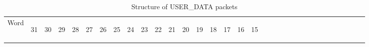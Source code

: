 \documentclass[11pt]{article}
\begin{document}
\begin{table}[h!]
    \centering
    \label{tab:userDataDef}
    \caption{Structure of USER\_DATA packets}
    \begin{tabular}{|p{1cm}|p{0.04cm}|p{0.04cm}|m{0.04cm}|m{0.04cm}|m{0.04cm}|m{0.04cm}|m{0.04cm}|m{0.04cm}|m{0.04cm}|
        m{0.04cm}|m{0.04cm}|m{0.04cm}|m{0.04cm}|m{0.04cm}|m{0.04cm}|m{0.04cm}|m{0.04cm}|m{0.04cm}|m{0.04cm}|m{0.04cm}|
        m{0.04cm}|m{0.04cm}|m{0.04cm}|m{0.04cm}|m{0.04cm}|m{0.04cm}|m{0.04cm}|m{0.04cm}|m{0.04cm}|m{0.04cm}|m{0.04cm}|m{0.04cm}|}
        \hline
        Word & 
        \begin{sideways}31\end{sideways} &
        \begin{sideways}30\end{sideways} & 
        \begin{sideways}29\end{sideways} &
        \begin{sideways}28\end{sideways} &
        \begin{sideways}27\end{sideways} &
        \begin{sideways}26\end{sideways} &
        \begin{sideways}25\end{sideways} &
        \begin{sideways}24\end{sideways} &
        \begin{sideways}23\end{sideways} &
        \begin{sideways}22\end{sideways} &
        \begin{sideways}21\end{sideways} &
        \begin{sideways}20\end{sideways} &
        \begin{sideways}19\end{sideways} &
        \begin{sideways}18\end{sideways} &
        \begin{sideways}17\end{sideways} &
        \begin{sideways}16\end{sideways} &
        \begin{sideways}15\end{sideways} &

\end{tabular}
\end{table}
\end{document}
